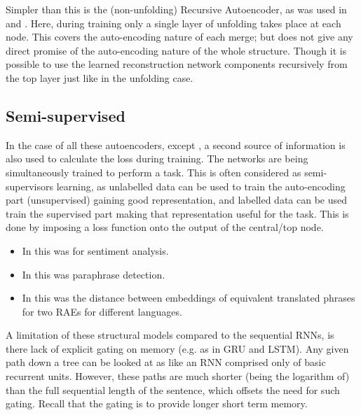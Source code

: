 \documentclass[12pt,parskip]{komatufte}
\begin{document}
Simpler than this is the (non-unfolding) Recursive Autoencoder,
as was used in \textcite{SocherEtAl2011:RAE} and \textcite{zhang2014BRAE}.
Here, during training only a single layer of unfolding takes place at each node.
This covers the auto-encoding nature of each merge;
but does not give any direct promise of the auto-encoding nature of the whole structure.
Though it is possible to use the learned reconstruction network components recursively from the top layer just like in the unfolding case.

\subsection{Semi-supervised}
In the case of all these autoencoders, except \textcite{iyyer2014generating}, a second source of information is also used to calculate the loss during training.
The networks are being simultaneously trained to perform a task.
This is often considered as semi-supervisors learning, as unlabelled data can be used to train the auto-encoding part (unsupervised) gaining good representation, and labelled data can be used train the supervised part making that representation useful for the task.
This is done by imposing a loss function onto the output of the central/top node.
\begin{itemize}
 \item In \textcite{SocherEtAl2011:RAE} this was for sentiment analysis.
 \item In \textcite{SocherEtAl2011:PoolRAE} this was paraphrase detection.
 \item In \textcite{zhang2014BRAE} this was the distance between embeddings of equivalent translated phrases for two RAEs for different languages.
\end{itemize}

 




A limitation of these structural models compared to the sequential RNNs,
is there lack of explicit gating on memory (e.g. as in GRU and LSTM).
Any given path down a tree can be looked at as like an RNN comprised only of basic recurrent units.
However, these paths are much shorter (being the logarithm of) than the full sequential length of the sentence,
which offsets the need for such gating.
Recall that the gating is to provide longer short term memory.
\end{document}
